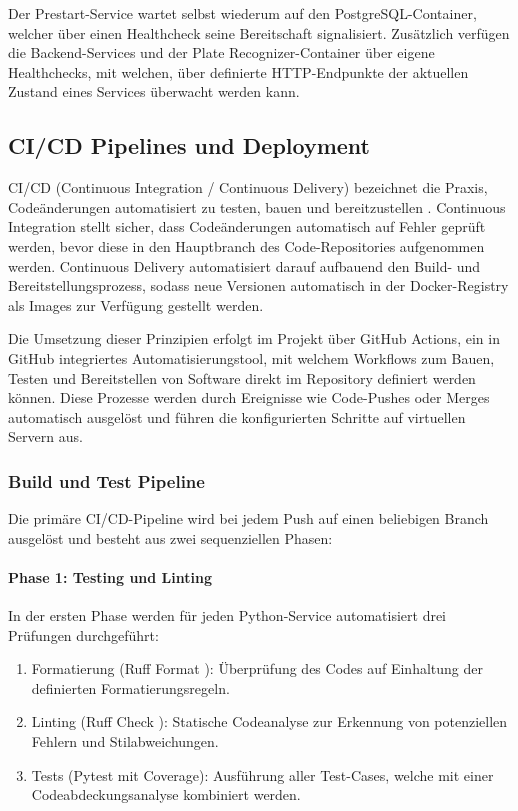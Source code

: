 Der Prestart-Service wartet selbst wiederum auf den PostgreSQL-Container, welcher über einen Healthcheck seine Bereitschaft signalisiert.
Zusätzlich verfügen die Backend-Services und der Plate Recognizer-Container über eigene Healthchecks, mit welchen, über definierte HTTP-Endpunkte der aktuellen Zustand eines Services überwacht werden kann.

\newpage
\subsection{CI/CD Pipelines und Deployment}
\label{sec:cicd}

CI/CD (Continuous Integration / Continuous Delivery) bezeichnet die Praxis, Codeänderungen automatisiert zu testen, bauen und bereitzustellen \cite{redhat_cicd}.
Continuous Integration stellt sicher, dass Codeänderungen automatisch auf Fehler geprüft werden, bevor diese in den Hauptbranch des Code-Repositories aufgenommen werden.
Continuous Delivery automatisiert darauf aufbauend den Build- und Bereitstellungsprozess, sodass neue Versionen automatisch in der Docker-Registry als Images zur Verfügung gestellt werden.

Die Umsetzung dieser Prinzipien erfolgt im Projekt über GitHub Actions, ein in GitHub integriertes Automatisierungstool, mit welchem Workflows zum Bauen, Testen und Bereitstellen von Software direkt im Repository definiert werden können.
Diese Prozesse werden durch Ereignisse wie Code-Pushes oder Merges automatisch ausgelöst und führen die konfigurierten Schritte auf virtuellen Servern aus. \cite{github_actions}

\subsubsection{Build und Test Pipeline}

Die primäre CI/CD-Pipeline wird bei jedem Push auf einen beliebigen Branch ausgelöst und besteht aus zwei sequenziellen Phasen:

\paragraph{Phase 1: Testing und Linting}
In der ersten Phase werden für jeden Python-Service automatisiert drei Prüfungen durchgeführt:

\begin{enumerate}
  \item Formatierung (Ruff Format \cite{ruff_formatter}): Überprüfung des Codes auf Einhaltung der definierten Formatierungsregeln.
  \item Linting (Ruff Check \cite{ruff_linter}): Statische Codeanalyse zur Erkennung von potenziellen Fehlern und Stilabweichungen.
  \item Tests (Pytest mit Coverage): Ausführung aller Test-Cases, welche mit einer Codeabdeckungsanalyse kombiniert werden.
\end{enumerate}

